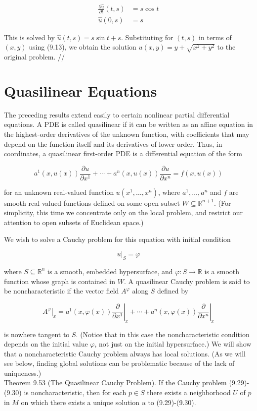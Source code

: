 \documentclass[10pt]{article}
\begin{document}
$$
\begin{aligned}
\frac{\partial \widehat{u}}{\partial t}(t, s) & =s \cos t \\
\widehat{u}(0, s) & =s
\end{aligned}
$$

This is solved by $\hat{u}(t, s)=s \sin t+s$. Substituting for $(t, s)$ in terms of $(x, y)$ using (9.13), we obtain the solution $u(x, y)=y+\sqrt{x^{2}+y^{2}}$ to the original problem. //

\section*{Quasilinear Equations}
The preceding results extend easily to certain nonlinear partial differential equations. A PDE is called quasilinear if it can be written as an affine equation in the highest-order derivatives of the unknown function, with coefficients that may depend on the function itself and its derivatives of lower order. Thus, in coordinates, a quasilinear first-order PDE is a differential equation of the form

$$
a^{1}(x, u(x)) \frac{\partial u}{\partial x^{1}}+\cdots+a^{n}(x, u(x)) \frac{\partial u}{\partial x^{n}}=f(x, u(x))
$$

for an unknown real-valued function $u\left(x^{1}, \ldots, x^{n}\right)$, where $a^{1}, \ldots, a^{n}$ and $f$ are smooth real-valued functions defined on some open subset $W \subseteq \mathbb{R}^{n+1}$. (For simplicity, this time we concentrate only on the local problem, and restrict our attention to open subsets of Euclidean space.)

We wish to solve a Cauchy problem for this equation with initial condition

$$
\left.u\right|_{S}=\varphi
$$

where $S \subseteq \mathbb{R}^{n}$ is a smooth, embedded hypersurface, and $\varphi: S \rightarrow \mathbb{R}$ is a smooth function whose graph is contained in $W$. A quasilinear Cauchy problem is said to be noncharacteristic if the vector field $A^{\varphi}$ along $S$ defined by

$$
\left.A^{\varphi}\right|_{x}=\left.a^{1}(x, \varphi(x)) \frac{\partial}{\partial x^{1}}\right|_{x}+\cdots+\left.a^{n}(x, \varphi(x)) \frac{\partial}{\partial x^{n}}\right|_{x}
$$

is nowhere tangent to $S$. (Notice that in this case the noncharacteristic condition depends on the initial value $\varphi$, not just on the initial hypersurface.) We will show that a noncharacteristic Cauchy problem always has local solutions. (As we will see below, finding global solutions can be problematic because of the lack of uniqueness.)\\
Theorem 9.53 (The Quasilinear Cauchy Problem). If the Cauchy problem (9.29)-(9.30) is noncharacteristic, then for each $p \in S$ there exists a neighborhood $U$ of $p$ in $M$ on which there exists a unique solution $u$ to (9.29)-(9.30).
\end{document}
